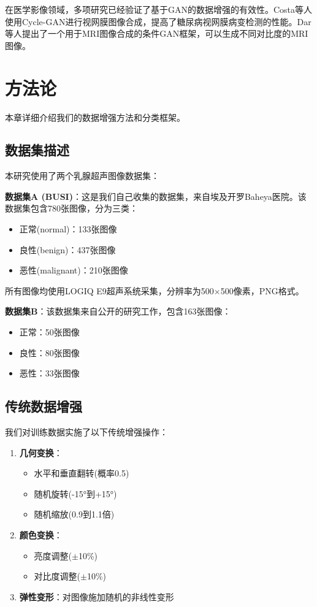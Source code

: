 \documentclass[supercite]{../Hust-undergraduate-translation/Experimental_Report}
\theoremstyle{definition}
\begin{document}
在医学影像领域，多项研究已经验证了基于GAN的数据增强的有效性。Costa等人使用Cycle-GAN进行视网膜图像合成，提高了糖尿病视网膜病变检测的性能。Dar等人提出了一个用于MRI图像合成的条件GAN框架，可以生成不同对比度的MRI图像。

\section{方法论}

本章详细介绍我们的数据增强方法和分类框架。

\subsection{数据集描述}

本研究使用了两个乳腺超声图像数据集：

\textbf{数据集A (BUSI)}：这是我们自己收集的数据集，来自埃及开罗Baheya医院。该数据集包含780张图像，分为三类：
\begin{itemize}
\item 正常(normal)：133张图像
\item 良性(benign)：437张图像  
\item 恶性(malignant)：210张图像
\end{itemize}

所有图像均使用LOGIQ E9超声系统采集，分辨率为500$\times$500像素，PNG格式。

\textbf{数据集B}：该数据集来自公开的研究工作，包含163张图像：
\begin{itemize}
\item 正常：50张图像
\item 良性：80张图像
\item 恶性：33张图像
\end{itemize}

\subsection{传统数据增强}

我们对训练数据实施了以下传统增强操作：

\begin{enumerate}
\item \textbf{几何变换}：
   \begin{itemize}
   \item 水平和垂直翻转(概率0.5)
   \item 随机旋转(-15°到+15°)
   \item 随机缩放(0.9到1.1倍)
   \end{itemize}
   
\item \textbf{颜色变换}：
   \begin{itemize}
   \item 亮度调整($\pm$10\%)
   \item 对比度调整($\pm$10\%)
   \end{itemize}

\item \textbf{弹性变形}：对图像施加随机的非线性变形
\end{enumerate}
\end{document}
